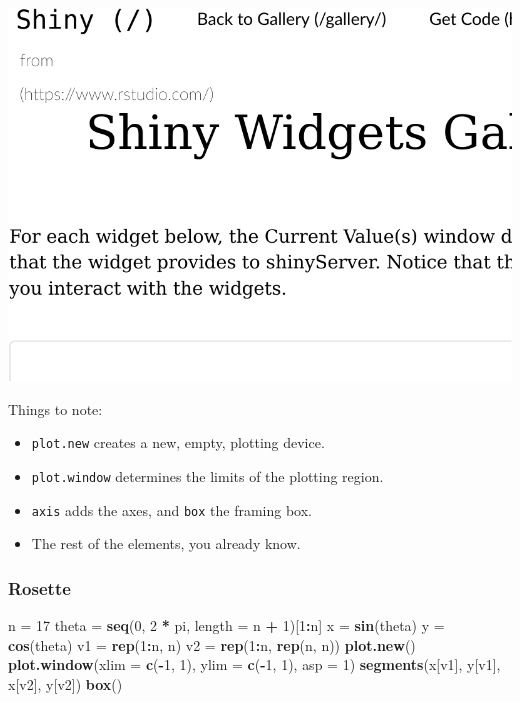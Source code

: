 \documentclass[]{book}
\newenvironment{Shaded}{\begin{snugshade}}{\end{snugshade}}
\newcommand{\DataTypeTok}[1]{\textcolor[rgb]{0.13,0.29,0.53}{#1}}
\newcommand{\DecValTok}[1]{\textcolor[rgb]{0.00,0.00,0.81}{#1}}
\newcommand{\KeywordTok}[1]{\textcolor[rgb]{0.13,0.29,0.53}{\textbf{#1}}}
\newcommand{\NormalTok}[1]{#1}
\newcommand{\OperatorTok}[1]{\textcolor[rgb]{0.81,0.36,0.00}{\textbf{#1}}}
\newcommand{\StringTok}[1]{\textcolor[rgb]{0.31,0.60,0.02}{#1}}
\providecommand{\tightlist}{%
  \setlength{\itemsep}{0pt}\setlength{\parskip}{0pt}}
\theoremstyle{definition}
\theoremstyle{definition}
\theoremstyle{definition}
\theoremstyle{remark}
\begin{document}
\includegraphics[width=0.5\linewidth]{Rcourse_files/figure-latex/unnamed-chunk-260-1}

Things to note:

\begin{itemize}
\tightlist
\item
  \texttt{plot.new} creates a new, empty, plotting device.
\item
  \texttt{plot.window} determines the limits of the plotting region.
\item
  \texttt{axis} adds the axes, and \texttt{box} the framing box.
\item
  The rest of the elements, you already know.
\end{itemize}

\hypertarget{rosette}{%
\subsubsection{Rosette}\label{rosette}}

\begin{Shaded}
\begin{Highlighting}[]
\NormalTok{n =}\StringTok{ }\DecValTok{17}
\NormalTok{theta =}\StringTok{ }\KeywordTok{seq}\NormalTok{(}\DecValTok{0}\NormalTok{, }\DecValTok{2} \OperatorTok{*}\StringTok{ }\NormalTok{pi, }\DataTypeTok{length =}\NormalTok{ n }\OperatorTok{+}\StringTok{ }\DecValTok{1}\NormalTok{)[}\DecValTok{1}\OperatorTok{:}\NormalTok{n]}
\NormalTok{x =}\StringTok{ }\KeywordTok{sin}\NormalTok{(theta)}
\NormalTok{y =}\StringTok{ }\KeywordTok{cos}\NormalTok{(theta)}
\NormalTok{v1 =}\StringTok{ }\KeywordTok{rep}\NormalTok{(}\DecValTok{1}\OperatorTok{:}\NormalTok{n, n)}
\NormalTok{v2 =}\StringTok{ }\KeywordTok{rep}\NormalTok{(}\DecValTok{1}\OperatorTok{:}\NormalTok{n, }\KeywordTok{rep}\NormalTok{(n, n))}
\KeywordTok{plot.new}\NormalTok{()}
\KeywordTok{plot.window}\NormalTok{(}\DataTypeTok{xlim =} \KeywordTok{c}\NormalTok{(}\OperatorTok{-}\DecValTok{1}\NormalTok{, }\DecValTok{1}\NormalTok{), }\DataTypeTok{ylim =} \KeywordTok{c}\NormalTok{(}\OperatorTok{-}\DecValTok{1}\NormalTok{, }\DecValTok{1}\NormalTok{), }\DataTypeTok{asp =} \DecValTok{1}\NormalTok{)}
\KeywordTok{segments}\NormalTok{(x[v1], y[v1], x[v2], y[v2])}
\KeywordTok{box}\NormalTok{()}
\end{Highlighting}
\end{Shaded}
\end{document}
